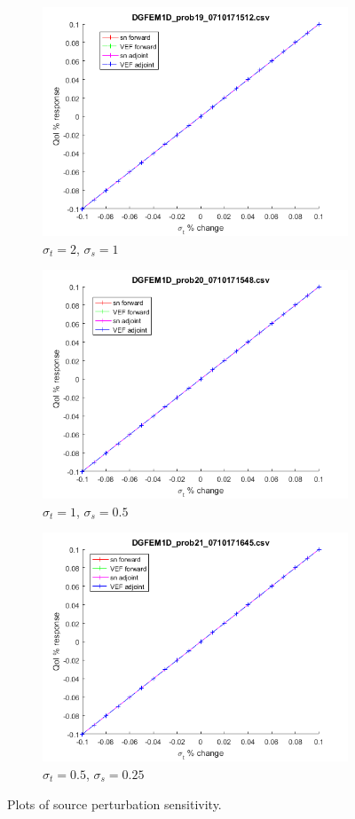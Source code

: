 \documentclass{article}
\newcommand{\sigt}{\sigma_t}
\newcommand{\sigs}{\sigma_s}
\begin{document}
\begin{figure}[H]
\label{HomoPertq}
\centering
\begin{subfigure}{.5\textwidth}
  \centering
  \includegraphics[width=.8\linewidth]{figures/19qSens.png}
  \caption{$\sigt=2$, $\sigs=1$}
  \label{fig:sfig1}
\end{subfigure}%
\begin{subfigure}{.5\textwidth}
  \centering
  \includegraphics[width=.8\linewidth]{figures/20qSens.png}
  \caption{$\sigt=1$, $\sigs=0.5$}
  \label{fig:sfig2}
\end{subfigure}
\begin{subfigure}{.5\textwidth}
  \centering
  \includegraphics[width=.8\linewidth]{figures/21qSens.png}
  \caption{$\sigt=0.5$, $\sigs=0.25$}
  \label{fig:sfig3}
\end{subfigure}
\caption{Plots of source perturbation sensitivity.}
\label{fig:fig}
\end{figure}
\end{document}
